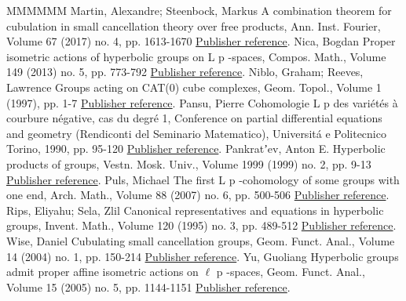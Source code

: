 \documentclass[11pt]{article}
\theoremstyle{definition}
\numberwithin{equation}{section}
\begin{document}
\begin{thebibliography}{MMMMMM}
 Martin, Alexandre; Steenbock, Markus A combination theorem for cubulation in small cancellation theory over free products, Ann. Inst. Fourier, Volume 67 (2017) no. 4, pp. 1613-1670 \href{https://ahl.centre-mersenne.org/item/AHL_2020__3__35_0/#MS}{Publisher reference}.
 Nica, Bogdan Proper isometric actions of hyperbolic groups on L p -spaces, Compos. Math., Volume 149 (2013) no. 5, pp. 773-792 \href{https://ahl.centre-mersenne.org/item/AHL_2020__3__35_0/#Ni}{Publisher reference}.
 Niblo, Graham; Reeves, Lawrence Groups acting on CAT(0) cube complexes, Geom. Topol., Volume 1 (1997), pp. 1-7 \href{https://ahl.centre-mersenne.org/item/AHL_2020__3__35_0/#NiRe}{Publisher reference}.
 Pansu, Pierre Cohomologie L p  des variétés à courbure négative, cas du degré 1, Conference on partial differential equations and geometry (Rendiconti del Seminario Matematico), Universitá e Politecnico Torino, 1990, pp. 95-120 \href{https://ahl.centre-mersenne.org/item/AHL_2020__3__35_0/#Pan}{Publisher reference}.
 Pankratʼev, Anton E. Hyperbolic products of groups, Vestn. Mosk. Univ., Volume 1999 (1999) no. 2, pp. 9-13 \href{https://ahl.centre-mersenne.org/item/AHL_2020__3__35_0/#Pankratev99}{Publisher reference}.
 Puls, Michael The first L p -cohomology of some groups with one end, Arch. Math., Volume 88 (2007) no. 6, pp. 500-506 \href{https://ahl.centre-mersenne.org/item/AHL_2020__3__35_0/#Puls}{Publisher reference}.
 Rips, Eliyahu; Sela, Zlil Canonical representatives and equations in hyperbolic groups, Invent. Math., Volume 120 (1995) no. 3, pp. 489-512 \href{https://ahl.centre-mersenne.org/item/AHL_2020__3__35_0/#RS95}{Publisher reference}.
 Wise, Daniel Cubulating small cancellation groups, Geom. Funct. Anal., Volume 14 (2004) no. 1, pp. 150-214 \href{https://ahl.centre-mersenne.org/item/AHL_2020__3__35_0/#Wise}{Publisher reference}.
 Yu, Guoliang Hyperbolic groups admit proper affine isometric actions on \(\ell\) p -spaces, Geom. Funct. Anal., Volume 15 (2005) no. 5, pp. 1144-1151 \href{https://ahl.centre-mersenne.org/item/AHL_2020__3__35_0/#Yu}{Publisher reference}.
\end{thebibliography}
\end{document}
